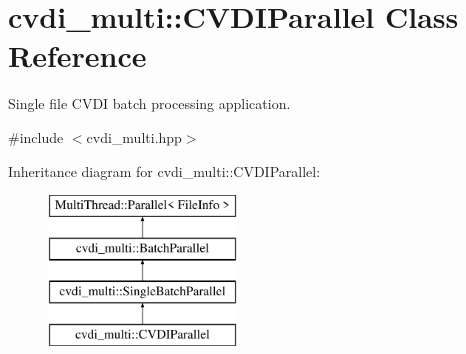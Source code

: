 \hypertarget{classcvdi__multi_1_1CVDIParallel}{}\section{cvdi\+\_\+multi\+:\+:C\+V\+D\+I\+Parallel Class Reference}
\label{classcvdi__multi_1_1CVDIParallel}


Single file C\+V\+DI batch processing application.  




{\ttfamily \#include $<$cvdi\+\_\+multi.\+hpp$>$}

Inheritance diagram for cvdi\+\_\+multi\+:\+:C\+V\+D\+I\+Parallel\+:\begin{figure}[H]
\begin{center}
\leavevmode
\includegraphics[height=4.000000cm]{classcvdi__multi_1_1CVDIParallel}
\end{center}
\end{figure}
